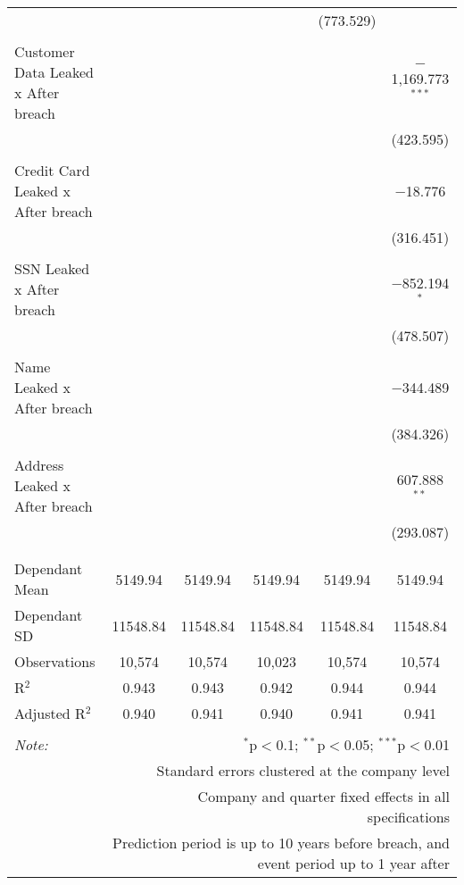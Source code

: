 \begin{table}[!htbp]
\begin{tabular}{@{\extracolsep{5pt}}lccccc}
  &  &  &  & (773.529) &  \\ 
  & & & & & \\ 
 Customer Data Leaked x After breach &  &  &  &  & $-$1,169.773$^{***}$ \\ 
  &  &  &  &  & (423.595) \\ 
  & & & & & \\ 
 Credit Card Leaked x After breach &  &  &  &  & $-$18.776 \\ 
  &  &  &  &  & (316.451) \\ 
  & & & & & \\ 
 SSN Leaked x After breach &  &  &  &  & $-$852.194$^{*}$ \\ 
  &  &  &  &  & (478.507) \\ 
  & & & & & \\ 
 Name Leaked x After breach &  &  &  &  & $-$344.489 \\ 
  &  &  &  &  & (384.326) \\ 
  & & & & & \\ 
 Address Leaked x After breach &  &  &  &  & 607.888$^{**}$ \\ 
  &  &  &  &  & (293.087) \\ 
  & & & & & \\ 
\hline \\[-1.8ex] 
Dependant Mean & 5149.94 & 5149.94 & 5149.94 & 5149.94 & 5149.94 \\ 
Dependant SD & 11548.84 & 11548.84 & 11548.84 & 11548.84 & 11548.84 \\ 
Observations & 10,574 & 10,574 & 10,023 & 10,574 & 10,574 \\ 
R$^{2}$ & 0.943 & 0.943 & 0.942 & 0.944 & 0.944 \\ 
Adjusted R$^{2}$ & 0.940 & 0.941 & 0.940 & 0.941 & 0.941 \\ 
\hline 
\hline \\[-1.8ex] 
\textit{Note:}  & \multicolumn{5}{r}{$^{*}$p$<$0.1; $^{**}$p$<$0.05; $^{***}$p$<$0.01} \\ 
 & \multicolumn{5}{r}{Standard errors clustered at the company level} \\ 
 & \multicolumn{5}{r}{Company and quarter fixed effects in all specifications} \\ 
 & \multicolumn{5}{r}{Prediction period is up to 10 years before breach, and event period up to 1 year after} \\ 
\end{tabular} 
\end{table} 
